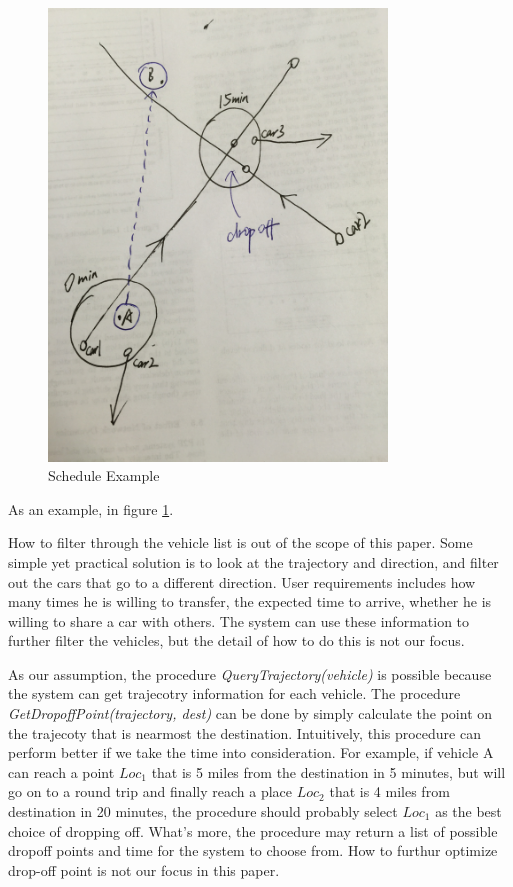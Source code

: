 \documentclass{vldb}
\begin{document}
\begin{figure}[ht!]
  \centering
  \includegraphics[width=90mm]{schedule.jpg}
  \caption{Schedule Example \label{schedule_fig}}
\end{figure}

As an example, in figure \ref{schedule_fig}. %

How to filter through the vehicle list is out of the scope of this paper.
Some simple yet practical solution is to look at the trajectory and direction,
and filter out the cars that go to a different direction.
User requirements includes how many times he is willing to transfer,
the expected time to arrive,
whether he is willing to share a car with others.
The system can use these information to further filter the vehicles,
but the detail of how to do this is not our focus.

As our assumption, the procedure \textit{QueryTrajectory(vehicle)} is possible
because the system can get trajecotry information for each vehicle.
The procedure \textit{GetDropoffPoint(trajectory, dest)} can be done
by simply calculate the point on the trajecoty that is nearmost the destination.
Intuitively, this procedure can perform better if we take the time into consideration.
For example, if vehicle A can reach a point $Loc_1$ that is 5 miles from the destination in 5 minutes,
but will go on to a round trip and finally reach a place $Loc_2$ that is 4 miles from destination in 20 minutes,
the procedure should probably select $Loc_1$ as the best choice of dropping off.
What's more, the procedure may return a list of possible dropoff points and time for the system to choose from.
How to furthur optimize drop-off point is not our focus in this paper.
\end{document}
